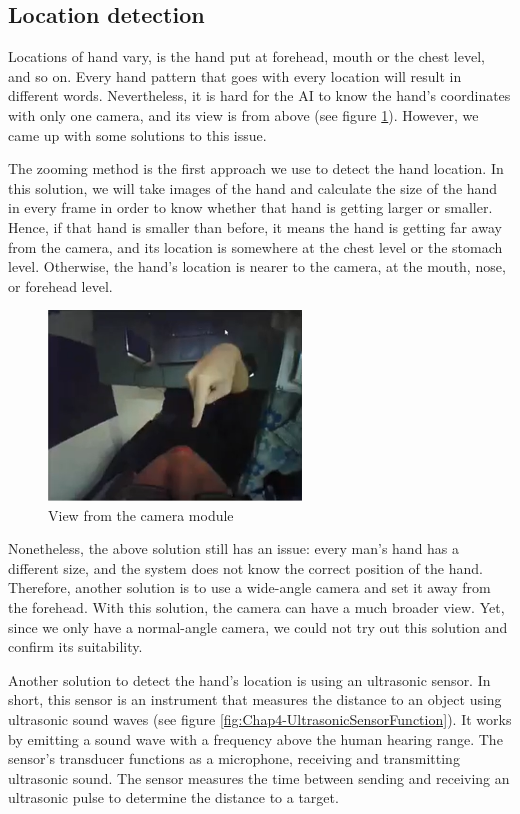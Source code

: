 \subsection{Location detection}

Locations of hand vary, is the hand put at forehead, mouth or the chest level, and so on. Every hand pattern that goes with every location will result in different words. Nevertheless, it is hard for the AI to know the hand's coordinates with only one camera, and its view is from above (see figure \ref{fig:Chap4-ViewFromCamera}). However, we came up with some solutions to this issue.

The zooming method is the first approach we use to detect the hand location. In this solution, we will take images of the hand and calculate the size of the hand in every frame in order to know whether that hand is getting larger or smaller. Hence, if that hand is smaller than before, it means the hand is getting far away from the camera, and its location is somewhere at the chest level or the stomach level. Otherwise, the hand's location is nearer to the camera, at the mouth, nose, or forehead level.

\begin{figure}[H]
	\centering
	\includegraphics[width=0.6\textwidth]{img/Chap4/ViewFromCamera.png}
	\caption{View from the camera module}
	\label{fig:Chap4-ViewFromCamera}
\end{figure}

Nonetheless, the above solution still has an issue: every man's hand has a different size, and the system does not know the correct position of the hand. Therefore, another solution is to use a wide-angle camera and set it away from the forehead. With this solution, the camera can have a much broader view. Yet, since we only have a normal-angle camera, we could not try out this solution and confirm its suitability.

Another solution to detect the hand's location is using an ultrasonic sensor. In short, this sensor is an instrument that measures the distance to an object using ultrasonic sound waves (see figure \ref{fig:Chap4-UltrasonicSensorFunction}). It works by emitting a sound wave with a frequency above the human hearing range. The sensor's transducer functions as a microphone, receiving and transmitting ultrasonic sound. The sensor measures the time between sending and receiving an ultrasonic pulse to determine the distance to a target.

